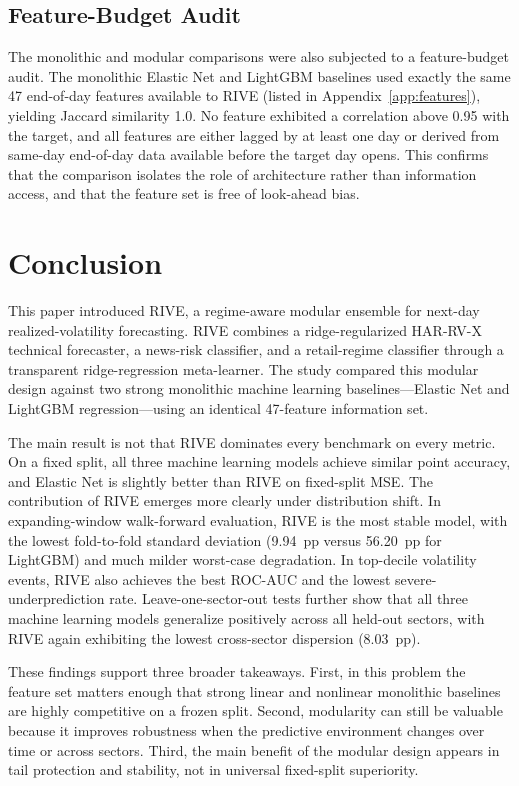 \documentclass[review]{elsarticle}
\begin{document}
\subsection{Feature-Budget Audit}\label{sec:feature-budget-audit}

The monolithic and modular comparisons were also subjected to a feature-budget audit. The monolithic Elastic Net and LightGBM baselines used exactly the same 47 end-of-day features available to RIVE (listed in Appendix~\ref{app:features}), yielding Jaccard similarity 1.0. No feature exhibited a correlation above 0.95 with the target, and all features are either lagged by at least one day or derived from same-day end-of-day data available before the target day opens. This confirms that the comparison isolates the role of architecture rather than information access, and that the feature set is free of look-ahead bias.

\section{Conclusion}\label{sec:conclusion}

This paper introduced RIVE, a regime-aware modular ensemble for next-day realized-volatility forecasting. RIVE combines a ridge-regularized HAR-RV-X technical forecaster, a news-risk classifier, and a retail-regime classifier through a transparent ridge-regression meta-learner. The study compared this modular design against two strong monolithic machine learning baselines---Elastic Net and LightGBM regression---using an identical 47-feature information set.

The main result is not that RIVE dominates every benchmark on every metric. On a fixed split, all three machine learning models achieve similar point accuracy, and Elastic Net is slightly better than RIVE on fixed-split MSE. The contribution of RIVE emerges more clearly under distribution shift. In expanding-window walk-forward evaluation, RIVE is the most stable model, with the lowest fold-to-fold standard deviation (9.94~pp versus 56.20~pp for LightGBM) and much milder worst-case degradation. In top-decile volatility events, RIVE also achieves the best ROC-AUC and the lowest severe-underprediction rate. Leave-one-sector-out tests further show that all three machine learning models generalize positively across all held-out sectors, with RIVE again exhibiting the lowest cross-sector dispersion (8.03~pp).

These findings support three broader takeaways. First, in this problem the feature set matters enough that strong linear and nonlinear monolithic baselines are highly competitive on a frozen split. Second, modularity can still be valuable because it improves robustness when the predictive environment changes over time or across sectors. Third, the main benefit of the modular design appears in tail protection and stability, not in universal fixed-split superiority.
\end{document}
